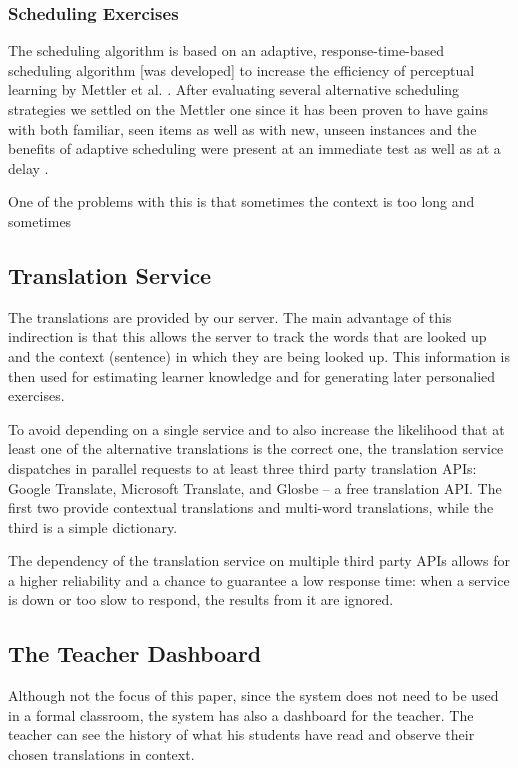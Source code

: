 \subsubsection{Scheduling Exercises}

The scheduling algorithm is based on an adaptive, response-time-based scheduling algorithm [was developed] to increase the efficiency of perceptual learning by Mettler et al. \cite{Mettler14-ARTS}. After evaluating several alternative scheduling strategies we settled on the Mettler one since it has been proven to have gains with both familiar, seen items as well as with new, unseen instances and the benefits of adaptive scheduling were present at an immediate test as well as at a delay \cite{Mettler14-ARTS}.



One of the problems with this is that sometimes the context is too long and sometimes 


\subsection{Translation Service}

The translations are provided by our server. The main advantage of this indirection is that this allows the server to track the words that are looked up and the context (sentence) in which they are being looked up. This information is then used for estimating learner knowledge and for generating later personalied exercises. 

To avoid depending on a single service and to also increase the likelihood that at least one of the alternative translations is the correct one, the translation service dispatches in parallel requests to at least three third party translation APIs: Google Translate, Microsoft Translate, and Glosbe -- a free translation API. The first two provide contextual translations and multi-word translations, while the third is a simple dictionary. 

The dependency of the translation service on multiple third party APIs allows for a higher reliability and a chance to guarantee a low response time: when a service is down or too slow to respond, the results from it are ignored.

\subsection{The Teacher Dashboard}

Although not the focus of this paper, since the system does not need to be used in a formal classroom, the system has also a dashboard for the teacher. The teacher can see the history of what his students have read and observe their chosen translations in context.






